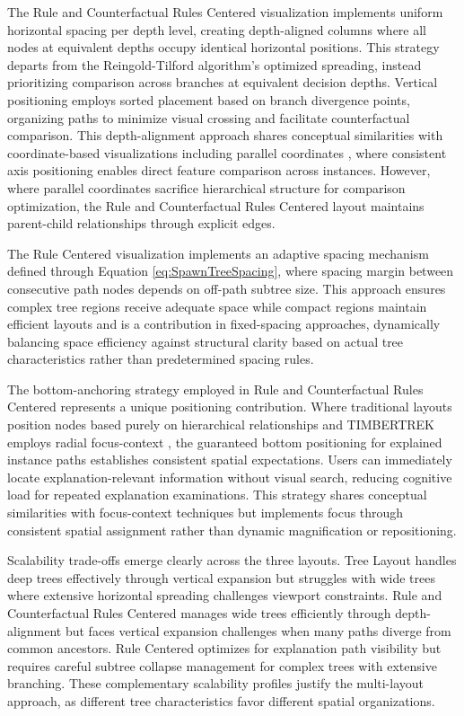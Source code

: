 The Rule and Counterfactual Rules Centered visualization implements uniform horizontal spacing per depth level, creating depth-aligned columns where all nodes at equivalent depths occupy identical horizontal positions. This strategy departs from the Reingold-Tilford algorithm's optimized spreading, instead prioritizing comparison across branches at equivalent decision depths. Vertical positioning employs sorted placement based on branch divergence points, organizing paths to minimize visual crossing and facilitate counterfactual comparison. This depth-alignment approach shares conceptual similarities with coordinate-based visualizations including parallel coordinates \cite{elzen2011baobabview, 10.1007/978-3-540-74205-0_121}, where consistent axis positioning enables direct feature comparison across instances. However, where parallel coordinates sacrifice hierarchical structure for comparison optimization, the Rule and Counterfactual Rules Centered layout maintains parent-child relationships through explicit edges.

The Rule Centered visualization implements an adaptive spacing mechanism defined through Equation \ref{eq:SpawnTreeSpacing}, where spacing margin between consecutive path nodes depends on off-path subtree size. This approach ensures complex tree regions receive adequate space while compact regions maintain efficient layouts and is a contribution in fixed-spacing approaches, dynamically balancing space efficiency against structural clarity based on actual tree characteristics rather than predetermined spacing rules.

The bottom-anchoring strategy employed in Rule and Counterfactual Rules Centered represents a unique positioning contribution. Where traditional layouts position nodes based purely on hierarchical relationships and TIMBERTREK employs radial focus-context \cite{wang2022timbertrek}, the guaranteed bottom positioning for explained instance paths establishes consistent spatial expectations. Users can immediately locate explanation-relevant information without visual search, reducing cognitive load for repeated explanation examinations. This strategy shares conceptual similarities with focus-context techniques but implements focus through consistent spatial assignment rather than dynamic magnification or repositioning.

Scalability trade-offs emerge clearly across the three layouts. Tree Layout handles deep trees effectively through vertical expansion but struggles with wide trees where extensive horizontal spreading challenges viewport constraints. Rule and Counterfactual Rules Centered manages wide trees efficiently through depth-alignment but faces vertical expansion challenges when many paths diverge from common ancestors. Rule Centered optimizes for explanation path visibility but requires careful subtree collapse management for complex trees with extensive branching. These complementary scalability profiles justify the multi-layout approach, as different tree characteristics favor different spatial organizations.

